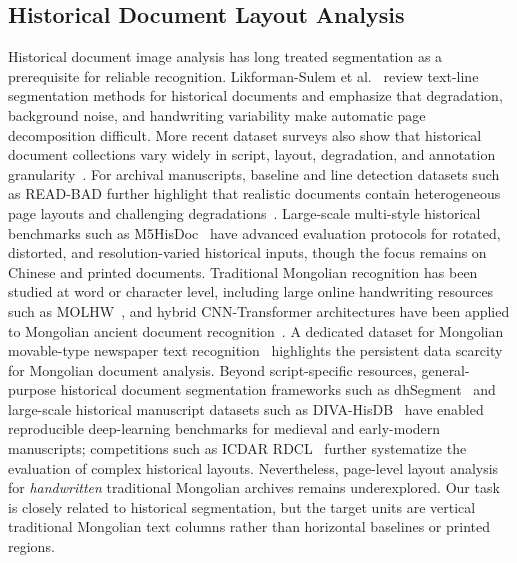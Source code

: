 \documentclass[pdflatex,sn-mathphys-num]{sn-jnl}
\begin{document}
\subsection{Historical Document Layout Analysis}
Historical document image analysis has long treated segmentation as a prerequisite for reliable recognition. Likforman-Sulem et al.~\cite{likforman2007textline} review text-line segmentation methods for historical documents and emphasize that degradation, background noise, and handwriting variability make automatic page decomposition difficult. More recent dataset surveys also show that historical document collections vary widely in script, layout, degradation, and annotation granularity~\cite{nikolaidou2022survey}. For archival manuscripts, baseline and line detection datasets such as READ-BAD further highlight that realistic documents contain heterogeneous page layouts and challenging degradations~\cite{gruning2017readbad}. Large-scale multi-style historical benchmarks such as M5HisDoc~\cite{shi2023m5hisdoc} have advanced evaluation protocols for rotated, distorted, and resolution-varied historical inputs, though the focus remains on Chinese and printed documents. Traditional Mongolian recognition has been studied at word or character level, including large online handwriting resources such as MOLHW~\cite{pan2023molhw}, and hybrid CNN-Transformer architectures have been applied to Mongolian ancient document recognition~\cite{sun2023mongolian}. A dedicated dataset for Mongolian movable-type newspaper text recognition~\cite{lu2024mongolian} highlights the persistent data scarcity for Mongolian document analysis. Beyond script-specific resources, general-purpose historical document segmentation frameworks such as dhSegment~\cite{oliveira2018dhsegment} and large-scale historical manuscript datasets such as DIVA-HisDB~\cite{simistira2016diva} have enabled reproducible deep-learning benchmarks for medieval and early-modern manuscripts; competitions such as ICDAR RDCL~\cite{clausner2019icdar} further systematize the evaluation of complex historical layouts. Nevertheless, page-level layout analysis for \emph{handwritten} traditional Mongolian archives remains underexplored. Our task is closely related to historical segmentation, but the target units are vertical traditional Mongolian text columns rather than horizontal baselines or printed regions.
\end{document}
